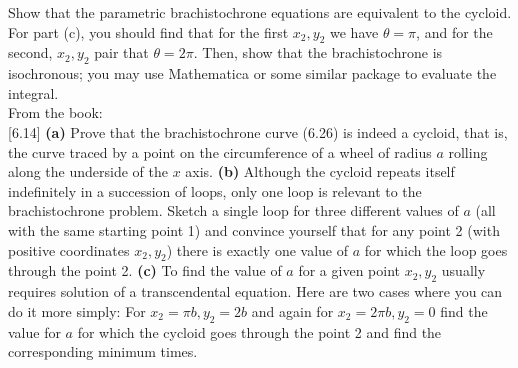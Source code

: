 \documentclass[11pt,letterpaper,boxed]{../hmcpset}
\begin{document}
\newpage

\begin{problem}[6.14 \& 6.25]
Show that the parametric brachistochrone equations are equivalent to the cycloid. For part (c), you should find that for the first $x_2, y_2$ we have $\theta = \pi$, and for the second, $x_2, y_2$ pair that $\theta = 2\pi$. Then, show that the brachistochrone is isochronous; you may use Mathematica or some similar package to evaluate the integral.\\
From the book:\\

[6.14]
\textbf{(a)} Prove that the brachistochrone curve (6.26) is indeed a cycloid, that is, the curve traced by a point on the circumference of a wheel of radius $a$ rolling along the underside of the $x$ axis. \textbf{(b)} Although the cycloid repeats itself indefinitely in a succession of loops, only one loop is relevant to the brachistochrone problem. Sketch a single loop for three different values of $a$ (all with the same starting point 1) and convince yourself that for any point 2 (with positive coordinates $x_2, y_2$) there is exactly one value of $a$ for which the loop goes through the point 2. \textbf{(c)} To find the value of $a$ for a given point $x_2, y_2$ usually requires solution of a transcendental equation. Here are two cases where you can do it more simply: For $x_2 = \pi b, y_2 = 2b$ and again for $x_2 = 2\pi b, y_2 = 0$ find the value for $a$ for which the cycloid goes through the point 2 and find the corresponding minimum times.\\


\end{problem}
\end{document}
